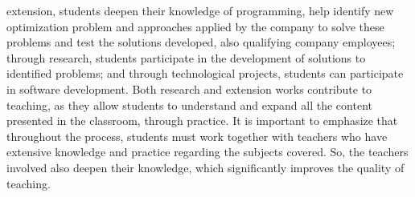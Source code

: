 \documentclass[preprint,12pt,authoryear]{elsarticle}
\begin{document}
extension, students deepen their knowledge of programming, help identify new optimization
problem and approaches applied by the company to solve these problems and test the
solutions developed, also qualifying company employees; through research, students
participate in the development of solutions to identified problems; and through technological
projects, students can participate in software development. Both research and extension
works contribute to teaching, as they allow students to understand and expand all the content
presented in the classroom, through practice. It is important to emphasize that throughout the
process, students must work together with teachers who have extensive knowledge and
practice regarding the subjects covered. So, the teachers involved also deepen their
knowledge, which significantly improves the quality of teaching.





\begin{thebibliography}{00}


\bibitem[ ()]{}

\end{thebibliography}
\end{document}
